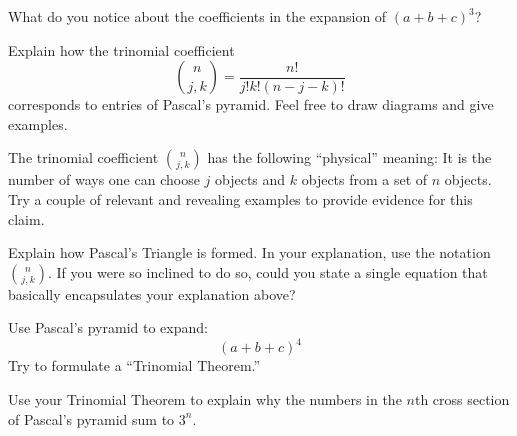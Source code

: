 \begin{prob} 
What do you notice about the coefficients in the expansion of $(a + b + c)^3$?
\end{prob}


\begin{prob} Explain how the trinomial coefficient
\[
\binom{n}{j,k} = \frac{n!}{j! k!(n-j-k)!}
\]
corresponds to entries of Pascal's pyramid. Feel free to draw diagrams
and give examples.
\end{prob}

\begin{prob} 
The trinomial coefficient $\binom{n}{j,k}$ has the following
``physical'' meaning: It is the number of ways one can choose $j$
objects and $k$ objects from a set of $n$ objects. Try a couple of
relevant and revealing examples to provide evidence for this claim.
\end{prob}

\begin{prob}  
Explain how Pascal's Triangle is formed. In your explanation, use the
notation $\binom{n}{j,k}$. If you were so inclined to do so, could you
state a single equation that basically encapsulates your explanation
above?
\end{prob}


\begin{prob} 
Use Pascal's pyramid to expand:
\[
(a + b + c)^4
\]
Try to formulate a ``Trinomial Theorem.''
\end{prob}

\begin{prob} Use your Trinomial Theorem to explain why the numbers in the $n$th cross section of Pascal's pyramid sum to $3^n$.
\end{prob}

